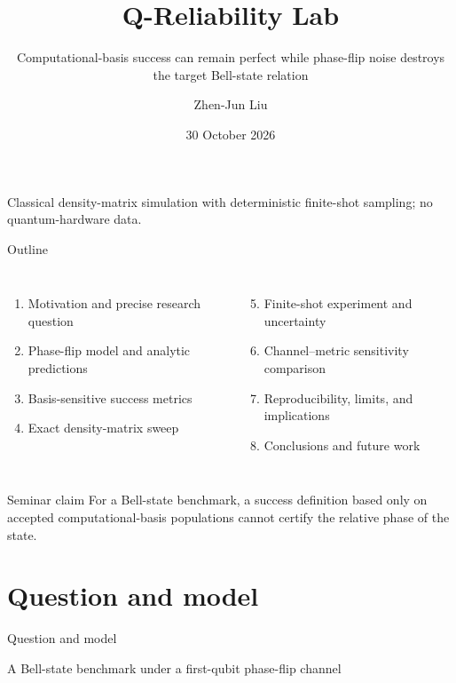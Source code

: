 \documentclass[10pt,aspectratio=169]{beamer}
\title[Q-Reliability Lab]{Q-Reliability Lab}
\subtitle{Computational-basis success can remain perfect while phase-flip noise destroys the target Bell-state relation}
\author{Zhen-Jun Liu}
\institute{Independent research project}
\date{30 October 2026}
\newcommand{\sourcefoot}[1]{}
\begin{document}
\begin{frame}
  \titlepage
  \vfill
  \begin{center}
  \small Classical density-matrix simulation with deterministic finite-shot sampling; no quantum-hardware data.
  \end{center}
\end{frame}

\begin{frame}{Outline}
\begin{columns}[T]
\begin{enumerate}
  \item Motivation and precise research question
  \item Phase-flip model and analytic predictions
  \item Basis-sensitive success metrics
  \item Exact density-matrix sweep
\end{enumerate}
\begin{enumerate}
  \setcounter{enumi}{4}
  \item Finite-shot experiment and uncertainty
  \item Channel--metric sensitivity comparison
  \item Reproducibility, limits, and implications
  \item Conclusions and future work
\end{enumerate}
\end{columns}
\vspace{3mm}
\begin{block}{Seminar claim}
For a Bell-state benchmark, a success definition based only on accepted computational-basis populations cannot certify the relative phase of the state.
\end{block}
\sourcefoot{Project source, analytic record, and committed experiment artifacts.}
\end{frame}

\section{Question and model}
\begin{frame}[plain]
\vfill\centering
{\color{quantumblue}\LARGE Question and model}\par\vspace{3mm}
\large A Bell-state benchmark under a first-qubit phase-flip channel
\vfill
\end{frame}
\end{document}
